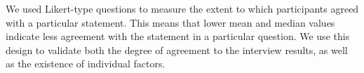 We used Likert-type questions to measure the extent to which participants agreed with a particular statement. This means that lower mean and median values indicate less agreement with the statement in a particular question.
We use this design to validate both the degree of agreement to the interview results, as well as the existence of individual factors.
